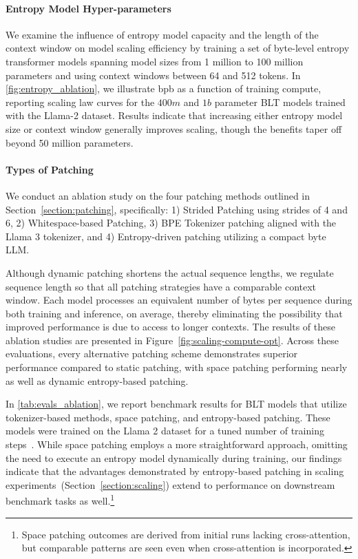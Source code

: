 \paragraph{Entropy Model Hyper-parameters} We examine the influence of entropy model capacity and the length of the context window on model scaling efficiency by training a set of byte-level entropy transformer models spanning model sizes from 1 million to 100 million parameters and using context windows between 64 and 512 tokens. In \autoref{fig:entropy_ablation}, we illustrate bpb as a function of training compute, reporting scaling law curves for the $400m$ and $1b$ parameter {\textsc BLT} models trained with the Llama-2 dataset. Results indicate that increasing either entropy model size or context window generally improves scaling, though the benefits taper off beyond 50 million parameters.

\paragraph{Types of Patching}

We conduct an ablation study on the four patching methods outlined in Section~\ref{section:patching}, specifically: 1) Strided Patching using strides of 4 and 6, 2) Whitespace-based Patching, 3) BPE Tokenizer patching aligned with the Llama 3 tokenizer, and 4) Entropy-driven patching utilizing a compact byte LLM.

Although dynamic patching shortens the actual sequence lengths, we regulate sequence length so that all patching strategies have a comparable context window. Each model processes an equivalent number of bytes per sequence during both training and inference, on average, thereby eliminating the possibility that improved performance is due to access to longer contexts. The results of these ablation studies are presented in Figure~\ref{fig:scaling-compute-opt}. Across these evaluations, every alternative patching scheme demonstrates superior performance compared to static patching, with space patching performing nearly as well as dynamic entropy-based patching.

In \autoref{tab:evals_ablation}, we report benchmark results for {\textsc BLT} models that utilize tokenizer-based methods, space patching, and entropy-based patching. These models were trained on the Llama 2 dataset for a tuned number of training steps~\citep{dubey2024llama}. While space patching employs a more straightforward approach, omitting the need to execute an entropy model dynamically during training, our findings indicate that the advantages demonstrated by entropy-based patching in scaling experiments~(Section~\ref{section:scaling}) extend to performance on downstream benchmark tasks as well.\footnote{Space patching outcomes are derived from initial runs lacking cross-attention, but comparable patterns are seen even when cross-attention is incorporated.}

